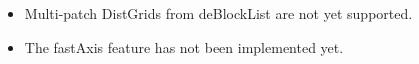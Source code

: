 
\begin{itemize}
\item Multi-patch DistGrids from deBlockList are not yet supported.
\item The fastAxis feature has not been implemented yet.
\end{itemize}
